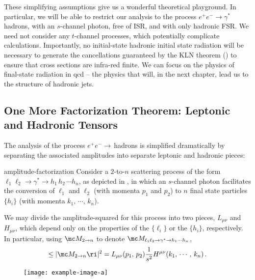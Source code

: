 These simplifying assumptions give us a wonderful theoretical playground.
%
In particular, we will be able to restrict our analysis to the process \(e^+ e^- \to\gamma^*\,\)hadrons, with an \(s\)-channel photon, free of ISR, and with only hadronic FSR.
%
We need not consider any \(t\)-channel processes, which potentially complicate calculations.
%
Importantly, no initial-state hadronic initial state radiation will be necessary to generate the cancellations guaranteed by the KLN theorem () to ensure that cross sections are infra-red finite.
%
We can focus on the physics of final-state radiation in \gls{qcd} -- the physics that will, in the next chapter, lead us to the structure of hadronic jets.



\subsection{One More Factorization Theorem: Leptonic and Hadronic Tensors}
\label{sec:ee-factorization}

The analysis of the process \(e^+ e^- \to\,\)hadrons is simplified dramatically by separating the associated amplitudes into separate leptonic and hadronic pieces:
\begin{proposition}{}{amplitude-factorization}
    Consider a \(2\)-to-\(n\) scattering process of the form \(\ell_1 \ell_2 \to \gamma^* \to h_1\,h_2\,\cdots h_n\), as depicted in , in which an \(s\)-channel photon facilitates the conversion of \(\ell_1\) and \(\ell_2\) (with momenta \(p_1\) and \(p_2\)) to \(n\) final state particles \(\{h_i\}\) (with momenta \(k_1,\,\cdots,\,k_n\)).

    We may divide the amplitude-squared for this process into two pieces, \(L_{\mu\nu}\) and \(H_{\mu\nu}\), which depend only on the properties of the \(\{\ell_i\}\) or the \(\{h_i\}\), respectively.
    In particular, using \(\mc M_{2 \to n}\) to denote \(\mc M_{\ell_1 \ell_2 \to \gamma^* \to h_1 \cdots h_n}\),
    \begin{align}
        \le| \mc M_{2 \to n} \ri|^2
        =
        L_{\mu \nu}(p_1, \, p_2)
        \frac{1}{s^2}
        H^{\mu \nu}(k_1, \,\cdots,\, k_n)
        \,.
    \end{align}
\end{proposition}

\begin{figure}[]
    \centering
    \texttt{[image: example-image-a]}
    \caption{}
    \label{fig:two-to-n-factorization}
\end{figure}

